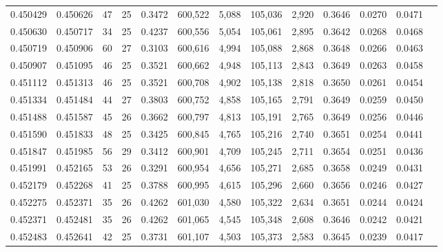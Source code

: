 \begin{tabular}{rrrrrrrrrrrrr}
0.450429 & 0.450626 &    47 &  25 &                                     0.3472 & 600,522 &   5,088 & 105,036 &   2,920 & 0.3646 & 0.0270 & 0.0471 \\
0.450630 & 0.450717 &    34 &  25 &                                     0.4237 & 600,556 &   5,054 & 105,061 &   2,895 & 0.3642 & 0.0268 & 0.0468 \\
0.450719 & 0.450906 &    60 &  27 &                                     0.3103 & 600,616 &   4,994 & 105,088 &   2,868 & 0.3648 & 0.0266 & 0.0463 \\
0.450907 & 0.451095 &    46 &  25 &                                     0.3521 & 600,662 &   4,948 & 105,113 &   2,843 & 0.3649 & 0.0263 & 0.0458 \\
0.451112 & 0.451313 &    46 &  25 &                                     0.3521 & 600,708 &   4,902 & 105,138 &   2,818 & 0.3650 & 0.0261 & 0.0454 \\
0.451334 & 0.451484 &    44 &  27 &                                     0.3803 & 600,752 &   4,858 & 105,165 &   2,791 & 0.3649 & 0.0259 & 0.0450 \\
0.451488 & 0.451587 &    45 &  26 &                                     0.3662 & 600,797 &   4,813 & 105,191 &   2,765 & 0.3649 & 0.0256 & 0.0446 \\
0.451590 & 0.451833 &    48 &  25 &                                     0.3425 & 600,845 &   4,765 & 105,216 &   2,740 & 0.3651 & 0.0254 & 0.0441 \\
0.451847 & 0.451985 &    56 &  29 &                                     0.3412 & 600,901 &   4,709 & 105,245 &   2,711 & 0.3654 & 0.0251 & 0.0436 \\
0.451991 & 0.452165 &    53 &  26 &                                     0.3291 & 600,954 &   4,656 & 105,271 &   2,685 & 0.3658 & 0.0249 & 0.0431 \\
0.452179 & 0.452268 &    41 &  25 &                                     0.3788 & 600,995 &   4,615 & 105,296 &   2,660 & 0.3656 & 0.0246 & 0.0427 \\
0.452275 & 0.452371 &    35 &  26 &                                     0.4262 & 601,030 &   4,580 & 105,322 &   2,634 & 0.3651 & 0.0244 & 0.0424 \\
0.452371 & 0.452481 &    35 &  26 &                                     0.4262 & 601,065 &   4,545 & 105,348 &   2,608 & 0.3646 & 0.0242 & 0.0421 \\
0.452483 & 0.452641 &    42 &  25 &                                     0.3731 & 601,107 &   4,503 & 105,373 &   2,583 & 0.3645 & 0.0239 & 0.0417 \\

\end{tabular}
